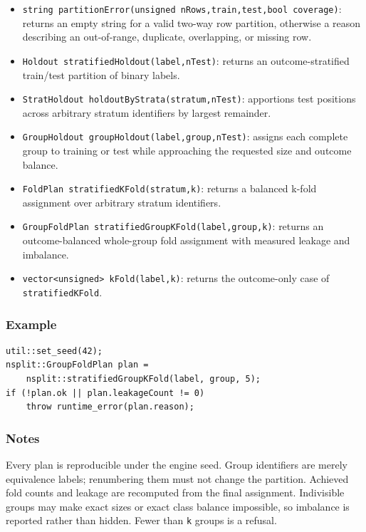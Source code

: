 \begin{itemize}
\item \texttt{string partitionError(unsigned nRows,train,test,bool coverage)}:
      returns an empty string for a valid two-way row partition, otherwise a
      reason describing an out-of-range, duplicate, overlapping, or missing row.
\item \texttt{Holdout stratifiedHoldout(label,nTest)}: returns an
      outcome-stratified train/test partition of binary labels.
\item \texttt{StratHoldout holdoutByStrata(stratum,nTest)}: apportions test
      positions across arbitrary stratum identifiers by largest remainder.
\item \texttt{GroupHoldout groupHoldout(label,group,nTest)}: assigns each
      complete group to training or test while approaching the requested size
      and outcome balance.
\item \texttt{FoldPlan stratifiedKFold(stratum,k)}: returns a balanced k-fold
      assignment over arbitrary stratum identifiers.
\item \texttt{GroupFoldPlan stratifiedGroupKFold(label,group,k)}: returns an
      outcome-balanced whole-group fold assignment with measured leakage and
      imbalance.
\item \texttt{vector<unsigned> kFold(label,k)}: returns the outcome-only case
      of \texttt{stratifiedKFold}.
\end{itemize}

\subsubsection{Example}
\begin{verbatim}
util::set_seed(42);
nsplit::GroupFoldPlan plan =
    nsplit::stratifiedGroupKFold(label, group, 5);
if (!plan.ok || plan.leakageCount != 0)
    throw runtime_error(plan.reason);
\end{verbatim}

\subsubsection{Notes}
Every plan is reproducible under the engine seed.  Group identifiers are merely
equivalence labels; renumbering them must not change the partition.  Achieved
fold counts and leakage are recomputed from the final assignment.  Indivisible
groups may make exact sizes or exact class balance impossible, so imbalance is
reported rather than hidden.  Fewer than \texttt{k} groups is a refusal.

